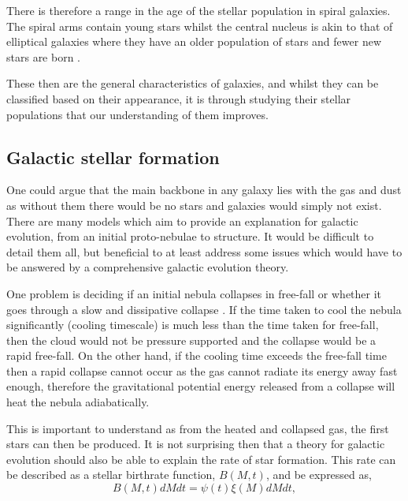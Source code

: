 \documentclass[12pt, twocolumn]{revtex4-1}    %
\begin{document}
There is therefore a range in the age of the stellar population in spiral galaxies. The spiral arms contain young stars whilst the central nucleus is akin to that of elliptical galaxies where they have an older population of stars and fewer new stars are born \citep{carroll_astro, binney_galaxies}.

These then are the general characteristics of galaxies, and whilst they can be classified based on their appearance, it is through studying their stellar populations that our understanding of them improves. 


\subsection{Galactic stellar formation}


One could argue that the main backbone in any galaxy lies with the gas and dust as without them there would be no stars and galaxies would simply not exist. There are many models which aim to provide an explanation for galactic evolution, from an initial proto-nebulae to structure. It would be difficult to detail them all, but beneficial to at least address some issues which would have to be answered by a comprehensive galactic evolution theory. 

One problem is deciding if an initial nebula collapses in free-fall or whether it goes through a slow and dissipative collapse \citep{carroll_astro}. If the time taken to cool the nebula significantly (cooling timescale) is much less than the time taken for free-fall, then the cloud would not be pressure supported and the collapse would be a rapid free-fall. On the other hand, if the cooling time exceeds the free-fall time then a rapid collapse cannot occur as the gas cannot radiate its energy away fast enough, therefore the gravitational potential energy released from a collapse will heat the nebula adiabatically. 

This is important to understand as from the heated and collapsed gas, the first stars can then be produced. It is not surprising then that a theory for galactic evolution should also be able to explain the rate of star formation. This rate can be described as a stellar birthrate function, $B(M,t)$, and be expressed as,
\begin{equation}
B(M,t)dM dt = \psi (t) \xi (M) dM dt, 
\label{eqn:stellar_birth_rate}
\end{equation}
\end{document}
